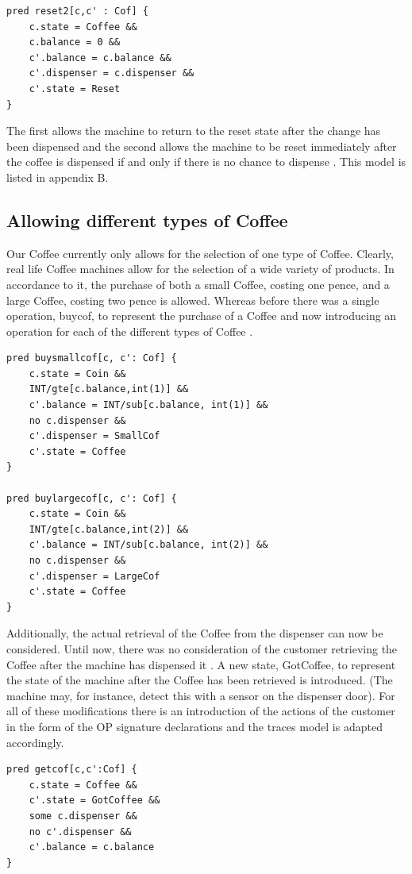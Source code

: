 \documentclass[a4paper,12pt]{report}
\begin{document}
\begin{onehalfspacing}
\begin{verbatim}
pred reset2[c,c' : Cof] {
	c.state = Coffee &&
	c.balance = 0 &&
	c'.balance = c.balance &&
	c'.dispenser = c.dispenser &&
	c'.state = Reset
}
\end{verbatim}

The first allows the machine to return to the reset state after the change has been dispensed and the second allows the machine to be reset immediately after the coffee is dispensed if and only if there is no chance to dispense \cite{RussellBoyatt}. This model is listed in appendix B.

\subsection{Allowing different types of Coffee}
\label{Different Coffees}

Our Coffee currently only allows for the selection of one type of Coffee. Clearly, real life Coffee machines allow for the selection of a wide variety of products. In accordance to it, the purchase of both a small Coffee, costing one pence, and a large Coffee, costing two pence is allowed. Whereas before there was a single operation, buycof, to represent the purchase of a Coffee and now introducing an operation for each of the different types of Coffee \cite{RussellBoyatt}.

\begin{verbatim}
pred buysmallcof[c, c': Cof] {
	c.state = Coin &&
	INT/gte[c.balance,int(1)] &&
	c'.balance = INT/sub[c.balance, int(1)] &&
	no c.dispenser &&
	c'.dispenser = SmallCof
	c'.state = Coffee
}

pred buylargecof[c, c': Cof] {
	c.state = Coin &&
	INT/gte[c.balance,int(2)] &&
	c'.balance = INT/sub[c.balance, int(2)] &&
	no c.dispenser &&
	c'.dispenser = LargeCof
	c'.state = Coffee
}
\end{verbatim}

 Additionally, the actual retrieval of the Coffee from the dispenser can now be considered. Until now, there was no consideration of the customer retrieving the Coffee after the machine has dispensed it \cite{RussellBoyatt}. A new state, GotCoffee, to represent the state of the machine after the Coffee has been retrieved is introduced. (The machine may, for instance, detect this with a sensor on the dispenser door). For all of these modifications there is an introduction of the actions of the customer in the form of the OP signature declarations and the traces model is adapted accordingly\cite{RussellBoyatt}.
 
\begin{verbatim}
pred getcof[c,c':Cof] {
	c.state = Coffee &&
	c'.state = GotCoffee &&
	some c.dispenser &&
	no c'.dispenser &&
	c'.balance = c.balance
}
\end{verbatim}


\end{onehalfspacing}
\end{document}
